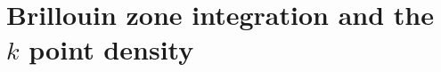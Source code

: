 \documentclass[11pt,bibliography=totoc,index=totoc]{scrbook}   %
\begin{document}





%
\section{Brillouin zone integration and the $k$ point density}\label{sec:bzint}
%
\end{document}
